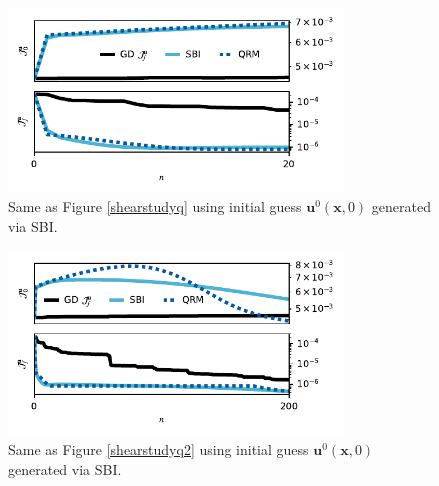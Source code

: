\documentclass[%
 reprint,
 amsmath,amssymb,
 aps,
 pre,
]{revtex4-2}
\renewcommand{\vec}[1]{\boldsymbol{#1}}
\begin{document}
\begin{figure}
  \centering
  \includegraphics[width=3.5in]{PLT20DS/both.pdf}
  \caption{Same as Figure \ref{shearstudyq} using initial guess $\vec{u}^0(\vec{x}, 0)$ generated via SBI.}
  \label{shearstudys}
\end{figure}

\begin{figure}
  \centering
  \includegraphics[width=3.5in]{PLT200DS/both.pdf}
  \caption{Same as Figure \ref{shearstudyq2} using initial guess $\vec{u}^0(\vec{x}, 0)$ generated via SBI.}
  \label{shearstudys2}
\end{figure}

  
\end{document}
